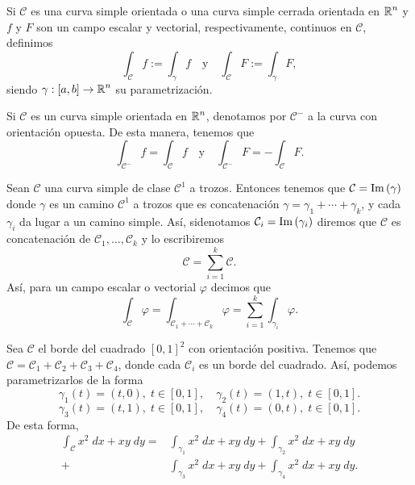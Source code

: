 \begin{notation}
	Si $\displaystyle \mathcal{C} $ es una curva simple orientada o una curva simple cerrada orientada en $\displaystyle \mathbb{R}^{n} $ y $\displaystyle f $ y $\displaystyle F $ son un campo escalar y vectorial, respectivamente, continuos en $\displaystyle \mathcal{C} $, definimos
	\[\int _{\mathcal{C}}f :=\int _{\gamma }f \quad \text{y} \quad \int _{\mathcal{C}}F :=\int _{\gamma }F  ,\]
	siendo $\displaystyle \gamma:\left[a,b\right] \to \mathbb{R}^{n} $ su parametrización. 
\end{notation}
\begin{notation}
Si $\displaystyle \mathcal{C} $ es un curva simple orientada en $\displaystyle \mathbb{R}^{n} $, denotamos por $\displaystyle \mathcal{C}^{-} $ a la curva con orientación opuesta. De esta manera, tenemos que
\[\int _{\mathcal{C}^{-}}f =\int _{\mathcal{C}}f \quad \text{y} \quad \int _{\mathcal{C}^{-}}F =-\int _{\mathcal{C}}F .\]
\end{notation}
\begin{notation}
	Sean $\displaystyle \mathcal{C} $ una curva simple de clase $\displaystyle \mathcal{C}^{1} $ a trozos. Entonces tenemos que $\displaystyle \mathcal{C}=\operatorname{Im}\left(\gamma \right) $ donde $\displaystyle \gamma  $ es un camino $\displaystyle \mathcal{C}^{1} $ a trozos que es concatenación $\displaystyle \gamma = \gamma_{1} + \cdots + \gamma_{k} $, y cada $\displaystyle \gamma_{i} $ da lugar a un camino simple. Así, sidenotamos $\displaystyle \mathcal{C}_{i}=\operatorname{Im}\left(\gamma_{i}\right) $ diremos que $\displaystyle \mathcal{C} $ es concatenación de $\displaystyle \mathcal{C}_{1}, \ldots, \mathcal{C}_{k} $ y lo escribiremos
	\[\mathcal{C}=\sum^{k}_{i = 1}\mathcal{C} .\]
	Así, para un campo escalar o vectorial $\displaystyle \varphi $ decimos que 
	\[\int _{\mathcal{C}}\varphi = \int _{\mathcal{C}_{1} + \cdots + \mathcal{C}_{k}}\varphi =\sum^{k}_{i = 1}\int _{\gamma_{i}}\varphi .\]
\end{notation}
\begin{eg}
	Sea $\displaystyle \mathcal{C} $ el borde del cuadrado $\displaystyle \left[0,1\right] ^{2} $ con orientación positiva. Tenemos que $\displaystyle \mathcal{C}=\mathcal{C}_{1} + \mathcal{C}_{2}+\mathcal{C}_{3}+\mathcal{C}_{4} $, donde cada $\displaystyle \mathcal{C}_{i} $ es un borde del cuadrado. Así, podemos parametrizarlos de la forma
	\[\gamma_{1}\left(t\right)=\left(t,0\right), \; t \in \left[0,1\right] , \quad \gamma_{2}\left(t\right)=\left(1,t\right), \; t \in \left[0,1\right]  .\]
	\[\gamma_{3}\left(t\right)=\left(t,1\right), \; t \in \left[0,1\right] , \quad \gamma_{4}\left(t\right)=\left(0,t\right), \; t \in \left[0,1\right]  .\]
De esta forma,
\[
\begin{split}
	\int _{\mathcal{C}}x^{2} \; dx + xy \; dy = & \int _{\gamma_{1}}x^{2} \; dx + xy \; dy +\int _{\gamma_{2}}x^{2} \; dx + xy \; dy \\
	+ &\int _{\gamma_{3}}x^{2} \; dx + xy \; dy +\int _{\gamma_{4}}x^{2} \; dx + xy \; dy.
\end{split}
\]
\end{eg}
